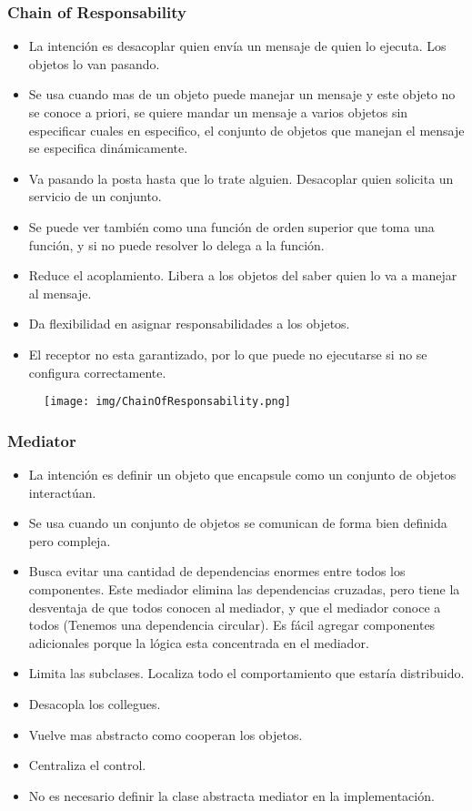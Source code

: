 \subsubsection*{Chain of Responsability}
\begin{itemize}
\item La intención es desacoplar quien envía un mensaje de quien lo ejecuta. Los objetos lo van pasando.
\item Se usa cuando mas de un objeto puede manejar un mensaje y este objeto no se conoce a priori, se quiere mandar un mensaje a varios objetos sin especificar cuales en especifico, el conjunto de objetos que manejan el mensaje se especifica dinámicamente.
\item Va pasando la posta hasta que lo trate alguien. Desacoplar quien solicita un servicio de un conjunto.
\item Se puede ver también como una función de orden superior que toma una función, y si no puede resolver lo delega a la función.
\item Reduce el acoplamiento. Libera a los objetos del saber quien lo va a manejar al mensaje.
\item Da flexibilidad en asignar responsabilidades a los objetos.
\item El receptor no esta garantizado, por lo que puede no ejecutarse si no se configura correctamente.
\end{itemize}

\begin{figure}[!htb]
    \centering
    \texttt{[image: img/ChainOfResponsability.png]}
\end{figure}

\subsubsection*{Mediator}
\begin{itemize}
\item La intención es definir un objeto que encapsule como un conjunto de objetos interactúan.
\item Se usa cuando un conjunto de objetos se comunican de forma bien definida pero compleja.
\item Busca evitar una cantidad de dependencias enormes entre todos los componentes. Este mediador elimina las dependencias cruzadas, pero tiene la desventaja de que todos conocen al mediador, y que el mediador conoce a todos (Tenemos una dependencia circular). Es fácil agregar componentes adicionales porque la lógica esta concentrada en el mediador.
\item Limita las subclases. Localiza todo el comportamiento que estaría distribuido.
\item Desacopla los collegues.
\item Vuelve mas abstracto como cooperan los objetos.
\item Centraliza el control.
\item No es necesario definir la clase abstracta mediator en la implementación.
\end{itemize}

